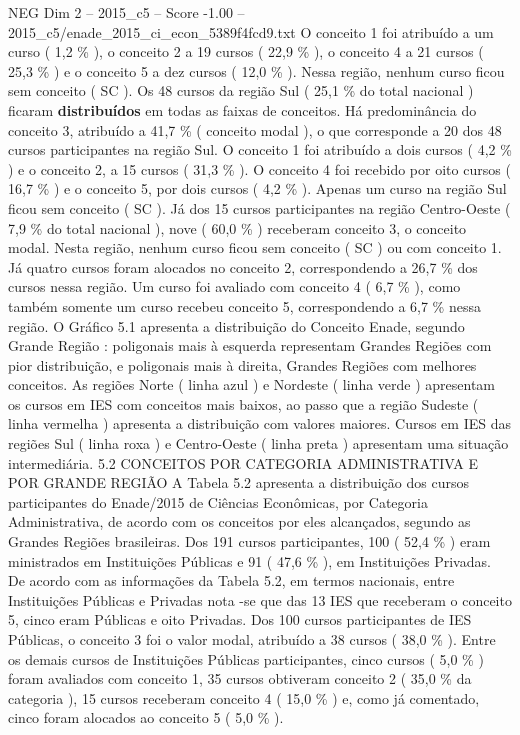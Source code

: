 \begin{textsample}{NEG Dim 2 – 2015\_c5 – Score -1.00 – 2015\_c5/enade\_2015\_ci\_econ\_5389f4fcd9.txt}
O conceito 1 foi atribuído a um curso ( 1,2 \% ), o conceito 2 a 19 cursos ( 22,9 \% ), o conceito 4 a 21 cursos ( 25,3 \% ) e o conceito 5 a dez cursos ( 12,0 \% ).
Nessa região, nenhum curso ficou sem conceito ( SC ).
Os 48 cursos da região Sul ( 25,1 \% do total nacional ) ficaram \textbf{distribuídos} em todas as faixas de conceitos.
Há predominância do conceito 3, atribuído a 41,7 \% ( conceito modal ), o que corresponde a 20 dos 48 cursos participantes na região Sul.
O conceito 1 foi atribuído a dois cursos ( 4,2 \% ) e o conceito 2, a 15 cursos ( 31,3 \% ).
O conceito 4 foi recebido por oito cursos ( 16,7 \% ) e o conceito 5, por dois cursos ( 4,2 \% ).
Apenas um curso na região Sul ficou sem conceito ( SC ).
Já dos 15 cursos participantes na região Centro-Oeste ( 7,9 \% do total nacional ), nove ( 60,0 \% ) receberam conceito 3, o conceito modal.
Nesta região, nenhum curso ficou sem conceito ( SC ) ou com conceito 1.
Já quatro cursos foram alocados no conceito 2, correspondendo a 26,7 \% dos cursos nessa região.
Um curso foi avaliado com conceito 4 ( 6,7 \% ), como também somente um curso recebeu conceito 5, correspondendo a 6,7 \% nessa região.
O Gráfico 5.1 apresenta a distribuição do Conceito Enade, segundo Grande Região : poligonais mais à esquerda representam Grandes Regiões com pior distribuição, e poligonais mais à direita, Grandes Regiões com melhores conceitos.
As regiões Norte ( linha azul ) e Nordeste ( linha verde ) apresentam os cursos em IES com conceitos mais baixos, ao passo que a região Sudeste ( linha vermelha ) apresenta a distribuição com valores maiores.
Cursos em IES das regiões Sul ( linha roxa ) e Centro-Oeste ( linha preta ) apresentam uma situação intermediária. 5.2 CONCEITOS POR CATEGORIA ADMINISTRATIVA E POR GRANDE REGIÃO A Tabela 5.2 apresenta a distribuição dos cursos participantes do Enade/2015 de Ciências Econômicas, por Categoria Administrativa, de acordo com os conceitos por eles alcançados, segundo as Grandes Regiões brasileiras.
Dos 191 cursos participantes, 100 ( 52,4 \% ) eram ministrados em Instituições Públicas e 91 ( 47,6 \% ), em Instituições Privadas.
De acordo com as informações da Tabela 5.2, em termos nacionais, entre Instituições Públicas e Privadas nota -se que das 13 IES que receberam o conceito 5, cinco eram Públicas e oito Privadas.
Dos 100 cursos participantes de IES Públicas, o conceito 3 foi o valor modal, atribuído a 38 cursos ( 38,0 \% ).
Entre os demais cursos de Instituições Públicas participantes, cinco cursos ( 5,0 \% ) foram avaliados com conceito 1, 35 cursos obtiveram conceito 2 ( 35,0 \% da categoria ), 15 cursos receberam conceito 4 ( 15,0 \% ) e, como já comentado, cinco foram alocados ao conceito 5 ( 5,0 \% ).

\end{textsample}
